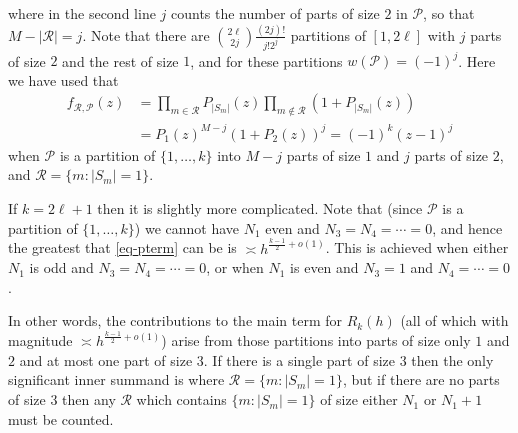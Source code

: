 \documentclass[11pt,letterpaper]{amsart}
\newcommand{\abs}[1]{\left\lvert #1\right\rvert}
\theoremstyle{definition}
\begin{document}
where in the second line $j$ counts the number of parts of size $2$ in $\mathcal P$, so that $M-|\mathcal R| = j$. Note that there are $\binom{2\ell}{2j}\frac{(2j)!}{j!2^j}$ partitions of $[1,2\ell]$ with $j$ parts of size $2$ and the rest of size $1$, and for these partitions $w(\mathcal P) = (-1)^j$. Here we have used that
\begin{align*}
f_{\mathcal R,\mathcal P}(z) 
&= \prod_{m \in \mathcal R} P_{|S_m|}(z) \prod_{m \not\in \mathcal R} \left(1+P_{|S_m|}(z)\right)\\
&=P_1(z)^{M-j}(1+P_2(z))^{j}=(-1)^k(z-1)^{j}
\end{align*}
when $\mathcal{P}$ is a partition of $\{1,\ldots,k\}$ into $M-j$ parts of size $1$ and $j$ parts of size $2$, and $\mathcal{R}=\{m: \abs{S_m}=1\}$. 

If $k=2\ell+1$ then it is slightly more complicated. Note that (since $\mathcal{P}$ is a partition of $\{1,\ldots,k\}$) we cannot have $N_1$ even and $N_3=N_4=\cdots=0$, and hence the greatest that \eqref{eq-pterm} can be is $\asymp h^{\frac{k-1}{2}+o(1)}$. This is achieved when either $N_1$ is odd and $N_3=N_4=\cdots=0$, or when $N_1$ is even and $N_3=1$ and $N_4=\cdots=0$.

In other words, the contributions to the main term for $R_k(h)$ (all of which with magnitude $\asymp h^{\frac{k-1}{2}+o(1)}$) arise from those partitions into parts of size only $1$ and $2$ and at most one part of size $3$. If there is a single part of size $3$ then the only significant inner summand is where $\mathcal{R}=\{m : \abs{S_m}=1\}$, but if there are no parts of size $3$ then any $\mathcal{R}$ which contains $\{m : \abs{S_m}=1\}$ of size either $N_1$ or $N_1+1$ must be counted.
\end{document}
